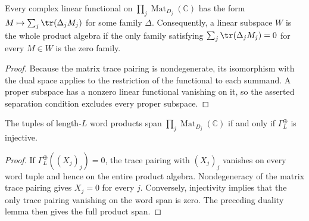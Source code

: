 \begin{lemma}
    \label{thm:matrix_family_trace_duality}
    \leanok
    Every complex linear functional on $\prod_j\operatorname{Mat}_{D_j}(\mathbb C)$
    has the form $M\mapsto\sum_j\tr(\Delta_jM_j)$ for some family
    $\Delta$. Consequently, a linear subspace $W$ is the whole
    product algebra if the only family satisfying
    $\sum_j\tr(\Delta_jM_j)=0$ for every $M\in W$ is the zero family.
\end{lemma}
\begin{proof}
    \leanok
    Because the matrix trace pairing is nondegenerate, its isomorphism with
    the dual space applies to the restriction of the functional to each
    summand. A proper subspace has a nonzero linear functional vanishing on
    it, so the asserted separation condition excludes every proper subspace.
\end{proof}

\begin{lemma}
    \label{thm:block_ground_space_map_injective}
    \leanok
    The tuples of length-$L$ word products span
    $\prod_j\operatorname{Mat}_{D_j}(\mathbb C)$ if and only if
    $\Gamma_L^{\oplus}$ is injective.
\end{lemma}
\begin{proof}
    \leanok
    If $\Gamma_L^{\oplus}((X_j)_j)=0$, the trace pairing with $(X_j)_j$
    vanishes on every word tuple and hence on the entire product algebra.
    Nondegeneracy of the matrix trace pairing gives $X_j=0$ for every $j$.
    Conversely, injectivity implies that the only trace pairing vanishing
    on the word span is zero. The preceding duality lemma then gives the
    full product span.
\end{proof}

